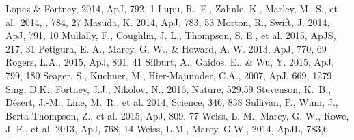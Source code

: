 \documentclass[iop]{emulateapj}
\begin{document}
\begin{thebibliography}{}
 Lopez \& Fortney, 2014, ApJ, 792, 1
 Lupu, R.~E., Zahnle, K., Marley, M.~S., et al.\ 2014, \apj, 784, 27 
 Masuda, K. 2014, ApJ, 783, 53
 Morton, R., Swift, J. 2014, ApJ, 791, 10
 Mullally, F., Coughlin, J. L., Thompson, S. E., et al. 2015, ApJS, 217, 31
 Petigura, E. A., Marcy, G. W., \& Howard, A. W. 2013, ApJ, 770, 69
Rogers, L.A., 2015, ApJ, 801, 41
 Silburt, A., Gaidos, E., \& Wu, Y. 2015, ApJ, 799, 180
 Seager, S., Kuchner, M., Hier-Majumder, C.A., 2007, ApJ, 669, 1279
 Sing, D.K., Fortney, J.J., Nikolov, N., 2016, Nature, 529,59
 Stevenson, K.~B., D{\'e}sert, J.-M., Line, M.~R., et al. 2014, Science, 346, 838 
 Sullivan, P., Winn, J., Berta-Thompson, Z., et al. 2015, ApJ, 809, 77
 Weiss, L. M., Marcy, G. W., Rowe, J. F., et al. 2013, ApJ, 768, 14
 Weiss, L.M., Marcy, G.W., 2014, ApJL, 783,6
\end{thebibliography}
\end{document}

